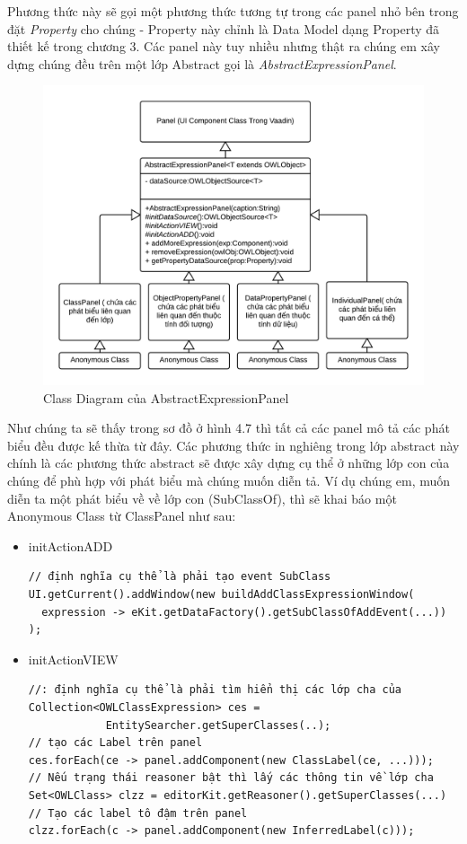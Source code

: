 Phương thức này sẽ gọi một phương thức tương tự trong các panel nhỏ bên trong đặt \textit{Property} cho chúng - Property này chỉnh là Data Model dạng Property đã thiết kế trong chương 3. Các panel này tuy nhiều nhưng thật ra chúng em xây dựng chúng đều trên một lớp Abstract gọi là \textit{AbstractExpressionPanel}.
\begin{figure}[h!]
	\centering
	\includegraphics[width=155mm]{Figures/uml_owleditor_abstractpanel_nobackground.png}
	\caption{Class Diagram của AbstractExpressionPanel\label{overflow}}
\end{figure}
Như chúng ta sẽ thấy trong sơ đồ ở hình 4.7 thì tất cả các panel mô tả các phát biểu đều được kế thừa từ đây. Các phương thức in nghiêng trong lớp abstract này chính là các phương thức abstract sẽ được xây dựng cụ thể ở những lớp con của chúng để phù hợp với phát biểu mà chúng muốn diễn tả. Ví dụ chúng em, muốn diễn ta một phát biểu về về lớp con (SubClassOf), thì sẽ khai báo một Anonymous Class từ ClassPanel như sau:
\begin{itemize}
\item initActionADD
\begin{verbatim}
// định nghĩa cụ thể là phải tạo event SubClass
UI.getCurrent().addWindow(new buildAddClassExpressionWindow(
  expression -> eKit.getDataFactory().getSubClassOfAddEvent(...))
);
\end{verbatim}
\item initActionVIEW
\begin{verbatim}
//: định nghĩa cụ thể là phải tìm hiển thị các lớp cha của
Collection<OWLClassExpression> ces = 
            EntitySearcher.getSuperClasses(..);
// tạo các Label trên panel
ces.forEach(ce -> panel.addComponent(new ClassLabel(ce, ...)));
// Nếu trạng thái reasoner bật thì lấy các thông tin về lớp cha
Set<OWLClass> clzz = editorKit.getReasoner().getSuperClasses(...)
// Tạo các label tô đậm trên panel 
clzz.forEach(c -> panel.addComponent(new InferredLabel(c)));
\end{verbatim}
\end{itemize}
